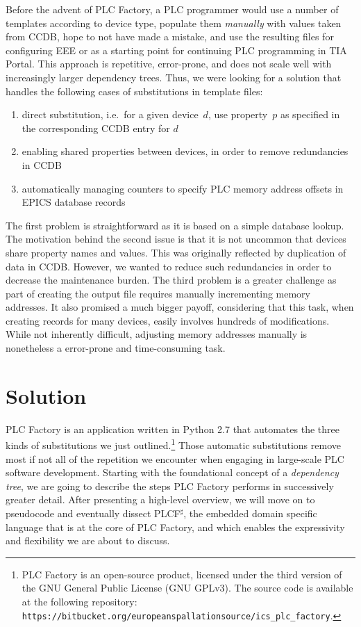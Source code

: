 \documentclass[a4paper,
              ]{jacow}
\begin{document}
Before the advent of PLC Factory, a PLC programmer would use a number of templates according to device type, populate them \emph{manually} with values taken from CCDB, hope to not have made a mistake, and use the resulting files for configuring EEE or as a starting point for continuing PLC programming in TIA Portal. This approach is repetitive, error-prone, and does not scale well with increasingly larger dependency trees. Thus, we were looking for a solution that handles the following cases of substitutions in template files:

\begin{enumerate}

\item direct substitution, i.e.\ for a given device~$d$, use property~$p$ as specified in the corresponding CCDB entry for $d$

\item enabling shared properties between devices, in order to remove redundancies in CCDB

\item automatically managing counters to specify PLC memory address offsets in EPICS database records

\end{enumerate}

The first problem is straightforward as it is based on a simple database lookup. The motivation behind the second issue is that it is not uncommon that devices share property names and values. This was originally reflected by duplication of data in CCDB. However, we wanted to reduce such redundancies in order to decrease the maintenance burden. The third problem is a greater challenge as part of creating the output file requires manually incrementing memory addresses. It also promised a much bigger payoff, considering that this task, when creating records for many devices, easily involves hundreds of modifications. While not inherently difficult, adjusting memory addresses manually is nonetheless a error-prone and time-consuming task. 



\section{Solution}
PLC Factory is an application written in Python 2.7 that automates the three kinds of substitutions we just outlined.\footnote{PLC Factory is an open-source product, licensed under the third version of the GNU General Public License (GNU GPLv3). The source code  is available at the following repository: \texttt{https://bitbucket.org/\linebreak europeanspallationsource/ics_plc_factory}.} Those automatic substitutions remove most if not all of the repetition we encounter when engaging in large-scale PLC software development. Starting with the foundational concept of a \emph{dependency tree}, we are going to describe the steps PLC Factory performs in successively greater detail. After presenting a high-level overview, we will move on to pseudocode and eventually dissect PLCF$^\sharp$, the embedded domain specific language that is at the core of PLC Factory, and which enables the expressivity and flexibility we are about to discuss.
\end{document}
